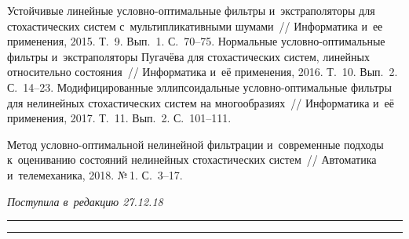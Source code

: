 \begin{multicols}{2}
{{\begin{thebibliography}{99}
 Устойчивые линейные условно-оптимальные 
фильтры и~экстраполяторы для стохастических систем с~мультипликативными шумами~// 
Информатика и~ее применения, 2015. Т.~9. Вып.~1. С.~70--75. 
 Нормальные услов\-но-оп\-ти\-маль\-ные фильтры 
и~экстраполяторы Пугачёва для стохастических систем, линейных относительно 
состояния~// Информатика и~её применения, 2016. Т.~10. Вып.~2. С.~14--23. 
 Модифицированные 
эллипсоидальные услов\-но-оп\-ти\-маль\-ные фильтры для нелинейных стохастических 
систем на многообразиях~// Информатика и~её применения, 2017. Т.~11. Вып.~2.  
С.~101--111.

 Метод 
условно-оптимальной нелинейной фильтрации и~современные подходы к~оцениванию 
состояний нелинейных стохастических\linebreak
 систем~// Автоматика и~телемеханика, 2018. №\,1. 
С.~3--17. 
 \end{thebibliography}

 }
 }

\end{multicols}

\vspace*{-3pt}

\hfill{\small\textit{Поступила в~редакцию 27.12.18}}

\vspace*{8pt}




\hrule

\vspace*{2pt}

\hrule


\def\tit{ON THE CONDITIONALLY MINIMAX NONLINEAR FILTERING 
CONCEPT DEVELOPMENT: FILTER MODIFICATION AND~ANALYSIS}


\def\titkol{On the conditionally minimax nonlinear filtering 
concept development: Filter modification and~analysis}

\def\aut{A.\,V.~Bosov and~G.\,B.~Miller}

\def\autkol{A.\,V.~Bosov and~G.\,B.~Miller}

